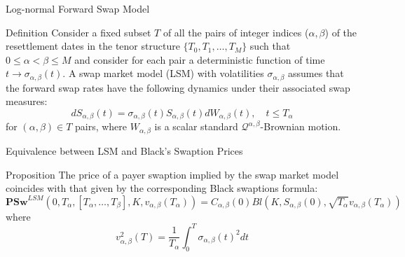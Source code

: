 \documentclass{beamer}
\begin{document}
\begin{frame}{Log-normal Forward Swap Model}
  \begin{block}{Definition}
    Consider a fixed subset $T$ of all the pairs of integer indices ($\alpha, \beta$) of the resettlement dates in the tenor structure $\{T_0, T_1,\ldots, T_M\}$ such that $0 \leq \alpha < \beta \leq M$ and consider for each pair a deterministic function of time $t\rightarrow \sigma_{\alpha,\beta}(t)$. A swap market model (LSM) with volatilities $\sigma_{\alpha,\beta}$ assumes that the forward swap rates have the following dynamics under their associated swap measures:
    \begin{equation}
      dS_{\alpha,\beta}(t) = \sigma_{\alpha,\beta}(t)S_{\alpha,\beta}(t)dW_{\alpha,\beta}(t),\quad t \leq T_\alpha
    \end{equation}
    for $(\alpha, \beta) \in T$ pairs, where $W_{\alpha,\beta}$ is a scalar standard $\mathcal{Q}^{\alpha,\beta}$-Brownian motion.
  \end{block}
\end{frame}

\begin{frame}{Equivalence between LSM and Black’s Swaption Prices}
  \begin{block}{Proposition}
    The price of a payer swaption implied by the swap market model coincides with that given by the corresponding Black swaptions formula:
    \begin{equation}
      \textbf{PSw}^{LSM}(0,T_\alpha, [T_\alpha,\ldots,T_\beta],K,v_{\alpha,\beta}(T_\alpha))=
      C_{\alpha, \beta}(0) Bl(K,S_{\alpha,\beta}(0),\sqrt{T_\alpha}v_{\alpha,\beta}(T_\alpha))
      \label{eq:black_swaptions}
    \end{equation}
    where 
	\begin{equation*}    	 
   		v_{\alpha,\beta}^2(T) =\frac{1}{T_\alpha}\int_0^T\sigma_{\alpha,\beta}(t)^2dt 	
    \end{equation*}
  \end{block}
\end{frame}
\end{document}
